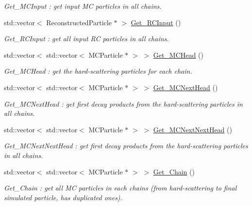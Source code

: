 \begin{DoxyCompactItemize}
\begin{DoxyCompactList}\small\item\em Get\_\-MCInput : get input MC particles in all chains. \item\end{DoxyCompactList}\item 
std::vector$<$ ReconstructedParticle $\ast$ $>$ \hyperlink{classToolSet_1_1CChain__Vec_aba6a8082d60fbc646abebfd98665c8f0}{Get\_\-RCInput} ()
\begin{DoxyCompactList}\small\item\em Get\_\-RCInput : get all input RC particles in all chains. \item\end{DoxyCompactList}\item 
std::vector$<$ std::vector$<$ MCParticle $\ast$ $>$ $>$ \hyperlink{classToolSet_1_1CChain__Vec_a27f257b172bd9fd5447d71dd69b9faff}{Get\_\-MCHead} ()
\begin{DoxyCompactList}\small\item\em Get\_\-MCHead : get the hard-\/scattering particles for each chain. \item\end{DoxyCompactList}\item 
std::vector$<$ std::vector$<$ MCParticle $\ast$ $>$ $>$ \hyperlink{classToolSet_1_1CChain__Vec_a22c91bb1f15d6139b942e08920851aad}{Get\_\-MCNextHead} ()
\begin{DoxyCompactList}\small\item\em Get\_\-MCNextHead : get first decay products from the hard-\/scattering particles in all chains. \item\end{DoxyCompactList}\item 
std::vector$<$ std::vector$<$ MCParticle $\ast$ $>$ $>$ \hyperlink{classToolSet_1_1CChain__Vec_a2546469860c85e211a76a3ec8cbf0bf2}{Get\_\-MCNextNextHead} ()
\begin{DoxyCompactList}\small\item\em Get\_\-MCNextNextHead : get first decay products from the hard-\/scattering particles in all chains. \item\end{DoxyCompactList}\item 
std::vector$<$ std::vector$<$ MCParticle $\ast$ $>$ $>$ \hyperlink{classToolSet_1_1CChain__Vec_a1192336ddae3a84cdaa2915b28955ccf}{Get\_\-Chain} ()
\begin{DoxyCompactList}\small\item\em Get\_\-Chain : get all MC particles in each chains (from hard-\/scattering to final simulated particle, has duplicated ones). \item\end{DoxyCompactList}\item 

\end{DoxyCompactItemize}
